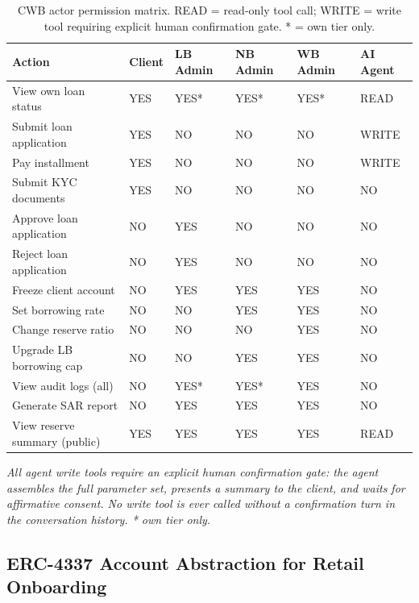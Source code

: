 \documentclass[12pt,a4paper]{report}
\begin{document}
\begin{table}[H]
\centering
\caption{CWB actor permission matrix. READ = read-only tool call; WRITE\dag{} = write tool requiring explicit human confirmation gate. * = own tier only.}
\label{tab:permission-matrix}
\renewcommand{\arraystretch}{1.3}
\small
\begin{tabular}{p{4.4cm}p{1.3cm}p{1.5cm}p{1.5cm}p{1.5cm}p{1.6cm}}
\hline
\textbf{Action} & \textbf{Client} & \textbf{LB Admin} & \textbf{NB Admin} & \textbf{WB Admin} & \textbf{AI Agent} \\
\hline
View own loan status & YES & YES* & YES* & YES* & READ \\
\hline
Submit loan application & YES & NO & NO & NO & WRITE\dag{} \\
\hline
Pay installment & YES & NO & NO & NO & WRITE\dag{} \\
\hline
Submit KYC documents & YES & NO & NO & NO & NO \\
\hline
Approve loan application & NO & YES & NO & NO & NO \\
\hline
Reject loan application & NO & YES & NO & NO & NO \\
\hline
Freeze client account & NO & YES & YES & YES & NO \\
\hline
Set borrowing rate & NO & NO & YES & YES & NO \\
\hline
Change reserve ratio & NO & NO & NO & YES & NO \\
\hline
Upgrade LB borrowing cap & NO & NO & YES & YES & NO \\
\hline
View audit logs (all) & NO & YES* & YES* & YES & NO \\
\hline
Generate SAR report & NO & YES & YES & YES & NO \\
\hline
View reserve summary (public) & YES & YES & YES & YES & READ \\
\hline
\end{tabular}
\vspace{2pt}

\noindent\textit{\small \dag{} All agent write tools require an explicit human confirmation gate: the agent assembles the full parameter set, presents a summary to the client, and waits for affirmative consent. No write tool is ever called without a confirmation turn in the conversation history. * own tier only.}
\end{table}

\subsection{ERC-4337 Account Abstraction for Retail Onboarding}
\label{sec:erc4337}
\end{document}
